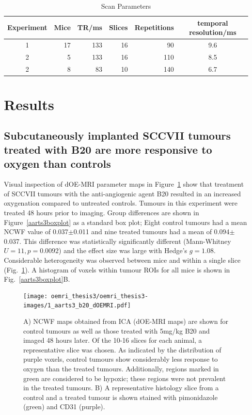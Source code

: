 \begin{table}[]
\centering
\begin{tabular}{c|r|r|r|r|c}
Experiment & Mice & TR/ms & Slices & Repetitions & temporal resolution/ms\\
\hline
 1 & 17& 133 & 16 & 90  & 9.6  \\
 2 & 5 & 133 & 16 & 110 & 8.5  \\
 2 & 8 & 83  & 10 & 140 & 6.7 \\
\end{tabular}
\caption{Scan Parameters}
\label{scanparams}
\end{table}

\section{Results} 

\subsection{Subcutaneously implanted SCCVII tumours treated with B20 are more responsive to oxygen than controls}

Visual inspection of \ac{dOE-MRI} parameter maps in Figure~\ref{dOEMRImaps} show that treatment of SCCVII tumours with the anti-angiogenic agent B20 resulted in an increased oxygenation compared to untreated controls.
Tumours in this experiment were treated 48 hours prior to imaging.
Group differences are shown in Figure~\ref{aarts3boxplot} as a standard box plot; Eight control tumours had a mean \acs{NCWF} value of 0.037$\pm$0.011 and nine treated tumours had a mean of 0.094$\pm$0.037.
This difference was statistically significantly different (Mann-Whitney $U = 11 , p = 0.0092$) and the effect size was large with Hedge's ${g=1.08}$.
Considerable heterogeneity was observed between mice and within a single slice (Fig.~\ref{dOEMRImaps}).
A histogram of voxels within tumour \acs{ROI}s for all mice is shown in Fig.~\ref{aarts3boxplot}B.

\begin{figure}[htbp]
   \centering
   \texttt{[image: oemri\_thesis3/oemri\_thesis3-images/1\_aarts3\_b20\_dOEMRI.pdf]} %
   \caption{A) \acs{NCWF} maps obtained from \ac{ICA} (\ac{dOE-MRI} maps) are shown for control tumours as well as those treated with 5mg/kg B20 and imaged 48 hours later.
   Of the 10-16 slices for each animal, a representative slice was chosen.
   As indicated by the distribution of purple voxels, control tumours show considerably less response to oxygen than the treated tumours.
   Additionally, regions marked in green are considered to be hypoxic; these regions were not prevalent in the treated tumours.
   B) A representative histology slice from a control and a treated tumour is shown stained with pimonidazole (green) and CD31 (purple).}
   \label{dOEMRImaps}
\end{figure}

